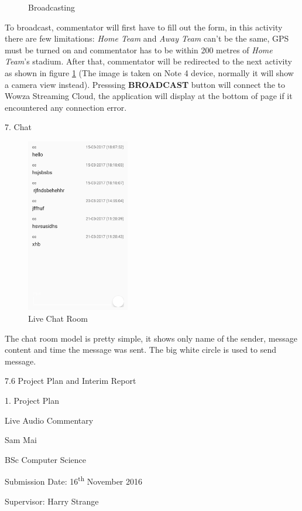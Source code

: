 \documentclass{article}
\begin{document}
\begin{flushleft}
\begin{figure}[H]
	\caption{Broadcasting}
	\label{fig:broadcast}
\end{figure}
To broadcast, commentator will first have to fill out the form, in this activity there are few limitations: \textit{Home Team} and \textit{Away Team} can't be the same, GPS must be turned on and commentator has to be within 200 metres of \textit{Home Team}'s stadium. After that, commentator will be redirected to the next activity as shown in figure \ref{fig:broadcast} (The image is taken on Note 4 device, normally it will show a camera view instead). Presssing \textbf{BROADCAST} button will connect the to Wowza Streaming Cloud, the application will display at the bottom of page if it encountered any connection error.\par
{\large 7. Chat}\par
\begin{figure}[H]
	\centering
	\includegraphics[width=0.40\textwidth]{chat}
	\caption{Live Chat Room}
	\label{fig:chat}
\end{figure}
The chat room model is pretty simple, it shows only name of the sender, message content and time the message was sent. The big white circle is used to send message.\par
{\Large 7.6 Project Plan and Interim Report}\par
{\large 1. Project Plan}\par
\end{flushleft}
\newpage
\begin{center}
{\Huge Live Audio Commentary\\[5cm]}

{\Large Sam Mai

BSc Computer Science

Submission Date: 16\textsuperscript{th} November 2016

Supervisor: Harry Strange}
\end{center}
\end{document}
